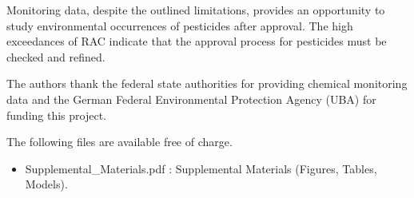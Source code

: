 \documentclass[journal=esthag,manuscript=article]{achemso}
\begin{document}
Monitoring data, despite the outlined limitations, provides an opportunity to study environmental occurrences of pesticides after approval.
The high exceedances of RAC indicate that the approval process for pesticides must be checked and refined.




\begin{acknowledgement}
The authors thank the federal state authorities for providing chemical monitoring data and the German Federal Environmental Protection Agency (UBA) for funding this project. 
\end{acknowledgement}



\begin{suppinfo}
The following files are available free of charge.
\begin{itemize}
  \item Supplemental\_Materials.pdf : Supplemental Materials (Figures, Tables, Models).
\end{itemize}
\end{suppinfo}




\end{document}
